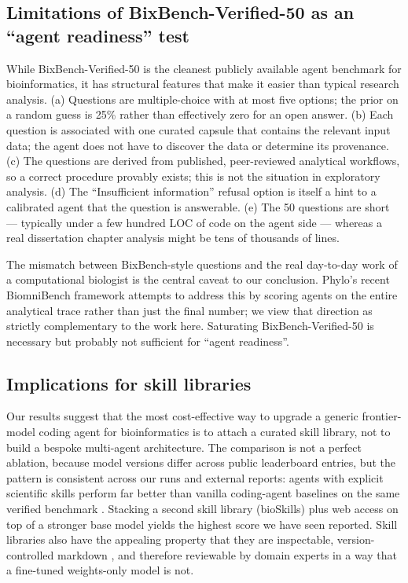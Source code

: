 \documentclass[11pt]{article}
\begin{document}
\subsection{Limitations of BixBench-Verified-50 as an
``agent readiness'' test}

While BixBench-Verified-50 is the cleanest publicly available agent
benchmark for bioinformatics, it has structural features that make it
easier than typical research analysis. (a) Questions are
multiple-choice with at most five options; the prior on a random guess
is 25\% rather than effectively zero for an open answer. (b) Each
question is associated with one curated capsule that contains the
relevant input data; the agent does not have to discover the data or
determine its provenance. (c) The questions are derived from published,
peer-reviewed analytical workflows, so a correct procedure provably
exists; this is not the situation in exploratory analysis. (d) The
``Insufficient information'' refusal option is itself a hint to a
calibrated agent that the question is answerable. (e) The 50 questions
are short --- typically under a few hundred LOC of code on the agent
side --- whereas a real dissertation chapter analysis might be tens of
thousands of lines.

The mismatch between BixBench-style questions and the real day-to-day
work of a computational biologist is the central caveat to our
conclusion. Phylo's recent BiomniBench framework \citep{phylo2026}
attempts to address this by scoring agents on the entire analytical
trace rather than just the final number; we view that direction as
strictly complementary to the work here. Saturating BixBench-Verified-50
is necessary but probably not sufficient for ``agent readiness''.

\subsection{Implications for skill libraries}

Our results suggest that the most cost-effective way to upgrade a
generic frontier-model coding agent for bioinformatics is to attach a
curated skill library, not to build a bespoke multi-agent architecture.
The comparison is not a perfect ablation, because model versions differ
across public leaderboard entries, but the pattern is consistent across
our runs and external reports: agents with explicit scientific skills
perform far better than vanilla coding-agent baselines on the same
verified benchmark \citep{phylo2026,kdense2026,sciagent2026}. Stacking a
second skill library (bioSkills) plus web access on top of a stronger base
model yields the highest score we have seen reported. Skill libraries also
have the appealing property that they are inspectable, version-controlled
markdown \citep{anthropicskills}, and therefore reviewable by domain
experts in a way that a fine-tuned weights-only model is not.
\end{document}
